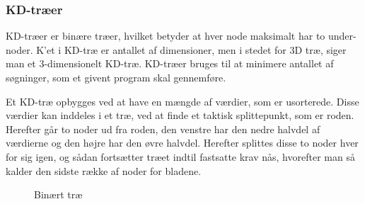 \subsubsection{KD-træer}
\label{sec:kdtree}

KD-træer er binære træer, hvilket betyder at hver node maksimalt har to under-noder. K'et i KD-træ er antallet af dimensioner, men i stedet for 3D træ, siger man et 3-dimensionelt KD-træ. KD-træer bruges til at minimere antallet af søgninger, som et givent program skal gennemføre. 

Et KD-træ opbygges ved at have en mængde af værdier, som er usorterede. Disse værdier kan inddeles i et træ, ved at finde et taktisk splittepunkt, som er roden. Herefter går to noder ud fra roden, den venstre har den nedre halvdel af værdierne og den højre har den øvre halvdel. Herefter splittes disse to noder hver for sig igen, og sådan fortsætter træet indtil fastsatte krav nås, hvorefter man så kalder den sidste række af noder for bladene. 

\begin{figure}[H]
  \centering
  \caption{Binært træ}
  \label{fig:binary-tree}
\end{figure}

